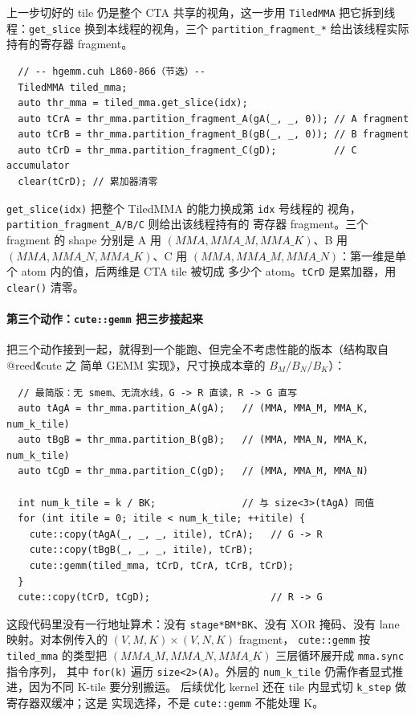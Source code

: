 上一步切好的 tile 仍是整个 CTA 共享的视角，这一步用 \texttt{TiledMMA}
把它拆到线程：\texttt{get\_slice} 换到本线程的视角，三个
\texttt{partition\_fragment\_*} 给出该线程实际持有的寄存器 fragment。

\begin{lstlisting}
  // -- hgemm.cuh L860-866（节选）--
  TiledMMA tiled_mma;
  auto thr_mma = tiled_mma.get_slice(idx);
  auto tCrA = thr_mma.partition_fragment_A(gA(_, _, 0)); // A fragment
  auto tCrB = thr_mma.partition_fragment_B(gB(_, _, 0)); // B fragment
  auto tCrD = thr_mma.partition_fragment_C(gD);          // C accumulator
  clear(tCrD); // 累加器清零
\end{lstlisting}

\texttt{get\_\allowbreak{}slice\allowbreak{}(idx)} 把整个 TiledMMA 的能力换成第 \texttt{idx} 号线程的
视角，\texttt{partition\_\allowbreak{}fragment\_\allowbreak{}}\allowbreak\texttt{A/B/C} 则给出该线程持有的
寄存器 fragment。三个 fragment 的 shape 分别是 A 用
$(MMA, MMA\_M, MMA\_K)$、B 用 $(MMA, MMA\_N, MMA\_K)$、C 用
$(MMA, MMA\_M, MMA\_N)$：第一维是单个 atom 内的值，后两维是 CTA tile 被切成
多少个 atom。\texttt{tCrD} 是累加器，用 \texttt{clear()} 清零。

\paragraph{第三个动作：\texttt{cute::gemm} 把三步接起来}

把三个动作接到一起，就得到一个能跑、但完全不考虑性能的版本（结构取自
@reed《cute 之 简单 GEMM 实现》，尺寸换成本章的 $B_M/B_N/B_K$）：

\begin{lstlisting}
  // 最简版：无 smem、无流水线，G -> R 直读，R -> G 直写
  auto tAgA = thr_mma.partition_A(gA);   // (MMA, MMA_M, MMA_K, num_k_tile)
  auto tBgB = thr_mma.partition_B(gB);   // (MMA, MMA_N, MMA_K, num_k_tile)
  auto tCgD = thr_mma.partition_C(gD);   // (MMA, MMA_M, MMA_N)

  int num_k_tile = k / BK;               // 与 size<3>(tAgA) 同值
  for (int itile = 0; itile < num_k_tile; ++itile) {
    cute::copy(tAgA(_, _, _, itile), tCrA);   // G -> R
    cute::copy(tBgB(_, _, _, itile), tCrB);
    cute::gemm(tiled_mma, tCrD, tCrA, tCrB, tCrD);
  }
  cute::copy(tCrD, tCgD);                     // R -> G
\end{lstlisting}

这段代码里没有一行地址算术：没有 \texttt{stage*BM*BK}、没有 XOR 掩码、没有
lane 映射。对本例传入的 $(V,M,K)\times(V,N,K)$ fragment，
\texttt{cute::gemm} 按 \texttt{tiled\_mma} 的类型把
$(MMA\_M,MMA\_N,MMA\_K)$ 三层循环展开成 \texttt{mma.sync} 指令序列，
其中 \texttt{for(k)} 遍历 \texttt{size<2>(A)}。外层的
\texttt{num\_k\_tile} 仍需作者显式推进，因为不同 K-tile 要分别搬运。
后续优化 kernel 还在 tile 内显式切 \texttt{k\_step} 做寄存器双缓冲；这是
实现选择，不是 \texttt{cute::gemm} 不能处理 K。

